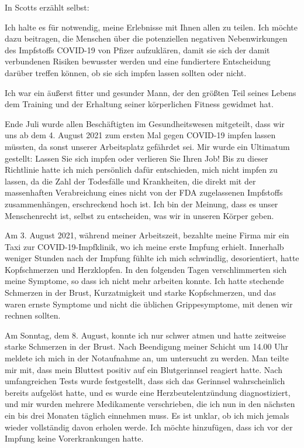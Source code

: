 In Scotts erzählt selbst:

Ich halte es für notwendig, meine Erlebnisse mit Ihnen allen zu teilen. Ich
möchte dazu beitragen, die Menschen über die potenziellen negativen
Nebenwirkungen des Impfstoffs COVID-19 von Pfizer aufzuklären, damit sie sich
der damit verbundenen Risiken bewusster werden und eine fundiertere Entscheidung
darüber treffen können, ob sie sich impfen lassen sollten oder nicht.

Ich war ein äußerst fitter und gesunder Mann, der den größten Teil seines Lebens
dem Training und der Erhaltung seiner körperlichen Fitness gewidmet hat.

Ende Juli wurde allen Beschäftigten im Gesundheitswesen mitgeteilt, dass wir uns
ab dem 4. August 2021 zum ersten Mal gegen COVID-19 impfen lassen müssten, da
sonst unserer Arbeitsplatz gefährdet sei. Mir wurde ein Ultimatum gestellt:
Lassen Sie sich impfen oder verlieren Sie Ihren Job! Bis zu dieser Richtlinie
hatte ich mich persönlich dafür entschieden, mich nicht impfen zu lassen, da die
Zahl der Todesfälle und Krankheiten, die direkt mit der massenhaften
Verabreichung eines nicht von der FDA zugelassenen Impfstoffs zusammenhängen,
erschreckend hoch ist. Ich bin der Meinung, dass es unser Menschenrecht ist,
selbst zu entscheiden, was wir in unseren Körper geben.

Am 3. August 2021, während meiner Arbeitszeit, bezahlte meine Firma mir ein Taxi
zur COVID-19-Impfklinik, wo ich meine erste Impfung erhielt. Innerhalb weniger
Stunden nach der Impfung fühlte ich mich schwindlig, desorientiert, hatte
Kopfschmerzen und Herzklopfen. In den folgenden Tagen verschlimmerten sich meine
Symptome, so dass ich nicht mehr arbeiten konnte. Ich hatte stechende Schmerzen
in der Brust, Kurzatmigkeit und starke Kopfschmerzen, und das waren ernste
Symptome und nicht die üblichen Grippesymptome, mit denen wir rechnen sollten.

Am Sonntag, dem 8. August, konnte ich nur schwer atmen und hatte zeitweise
starke Schmerzen in der Brust. Nach Beendigung meiner Schicht um 14.00 Uhr
meldete ich mich in der Notaufnahme an, um untersucht zu werden. Man teilte mir
mit, dass mein Bluttest positiv auf ein Blutgerinnsel reagiert hatte. Nach
umfangreichen Tests wurde festgestellt, dass sich das Gerinnsel wahrscheinlich
bereits aufgelöst hatte, und es wurde eine Herzbeutelentzündung diagnostiziert,
und mir wurden mehrere Medikamente verschrieben, die ich nun in den nächsten ein
bis drei Monaten täglich einnehmen muss. Es ist unklar, ob ich mich jemals
wieder vollständig davon erholen werde. Ich möchte hinzufügen, dass ich vor der
Impfung keine Vorerkrankungen hatte.

